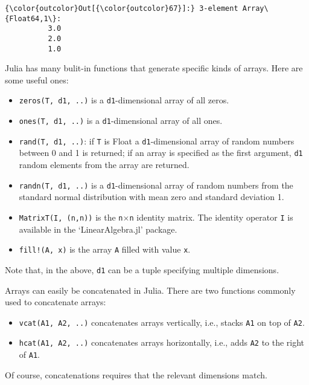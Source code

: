 \documentclass[11pt]{article}
\providecommand{\tightlist}{%
      \setlength{\itemsep}{0pt}\setlength{\parskip}{0pt}}
\begin{document}
\begin{Verbatim}[commandchars=\\\{\}]
{\color{outcolor}Out[{\color{outcolor}67}]:} 3-element Array\{Float64,1\}:
          3.0
          2.0
          1.0
\end{Verbatim}
            
    Julia has many bulit-in functions that generate specific kinds of
arrays. Here are some useful ones:

\begin{itemize}
\tightlist
\item
  \texttt{zeros(T,\ d1,\ ..)} is a \texttt{d1}-dimensional array of all
  zeros.
\item
  \texttt{ones(T,\ d1,\ ..)} is a \texttt{d1}-dimensional array of all
  ones.
\item
  \texttt{rand(T,\ d1,\ ..)}: if \texttt{T} is Float a
  \texttt{d1}-dimensional array of random numbers between 0 and 1 is
  returned; if an array is specified as the first argument, \texttt{d1}
  random elements from the array are returned.
\item
  \texttt{randn(T,\ d1,\ ..)} is a \texttt{d1}-dimensional array of
  random numbers from the standard normal distribution with mean zero
  and standard deviation 1.
\item
  \texttt{MatrixT(I,\ (n,n))} is the \texttt{n}\(\times\)\texttt{n}
  identity matrix. The identity operator \texttt{I} is available in the
  `LinearAlgebra.jl' package.
\item
  \texttt{fill!(A,\ x)} is the array \texttt{A} filled with value
  \texttt{x}.
\end{itemize}

Note that, in the above, \texttt{d1} can be a tuple specifying multiple
dimensions.

Arrays can easily be concatenated in Julia. There are two functions
commonly used to concatenate arrays:

\begin{itemize}
\tightlist
\item
  \texttt{vcat(A1,\ A2,\ ..)} concatenates arrays vertically, i.e.,
  stacks \texttt{A1} on top of \texttt{A2}.
\item
  \texttt{hcat(A1,\ A2,\ ..)} concatenates arrays horizontally, i.e.,
  adds \texttt{A2} to the right of \texttt{A1}.
\end{itemize}

Of course, concatenations requires that the relevant dimensions match.
\end{document}
